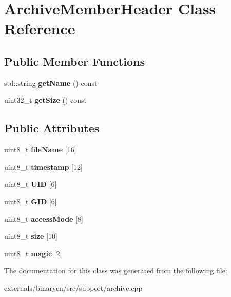 \hypertarget{class_archive_member_header}{}\section{Archive\+Member\+Header Class Reference}
\label{class_archive_member_header}
\subsection*{Public Member Functions}
\begin{DoxyCompactItemize}
\item 
\mbox{\label{class_archive_member_header_a798d909a4d2d9493299f6cb936af4206}} 
std\+::string {\bfseries get\+Name} () const
\item 
\mbox{\label{class_archive_member_header_ae109d3bfef0804b8d21732694e0f6a06}} 
uint32\+\_\+t {\bfseries get\+Size} () const
\end{DoxyCompactItemize}
\subsection*{Public Attributes}
\begin{DoxyCompactItemize}
\item 
\mbox{\label{class_archive_member_header_a7262b1ab70f0717f4e7f4c7a4fa60d6d}} 
uint8\+\_\+t {\bfseries file\+Name} \mbox{[}16\mbox{]}
\item 
\mbox{\label{class_archive_member_header_abb87c2a20f8d509f0651ad9a04959225}} 
uint8\+\_\+t {\bfseries timestamp} \mbox{[}12\mbox{]}
\item 
\mbox{\label{class_archive_member_header_a94152c86c76c20f9a93a1dd1bb4cff3f}} 
uint8\+\_\+t {\bfseries U\+ID} \mbox{[}6\mbox{]}
\item 
\mbox{\label{class_archive_member_header_ab4306c905abf0e3bd618e318a6396ead}} 
uint8\+\_\+t {\bfseries G\+ID} \mbox{[}6\mbox{]}
\item 
\mbox{\label{class_archive_member_header_a5834ab502d6e73b7640bebb28119db75}} 
uint8\+\_\+t {\bfseries access\+Mode} \mbox{[}8\mbox{]}
\item 
\mbox{\label{class_archive_member_header_a38d6f2987ac1dc03b40355ffb8195720}} 
uint8\+\_\+t {\bfseries size} \mbox{[}10\mbox{]}
\item 
\mbox{\label{class_archive_member_header_a29e134d460485fe8c882d823cace1f35}} 
uint8\+\_\+t {\bfseries magic} \mbox{[}2\mbox{]}
\end{DoxyCompactItemize}


The documentation for this class was generated from the following file\+:\begin{DoxyCompactItemize}
\item 
externals/binaryen/src/support/archive.\+cpp\end{DoxyCompactItemize}
